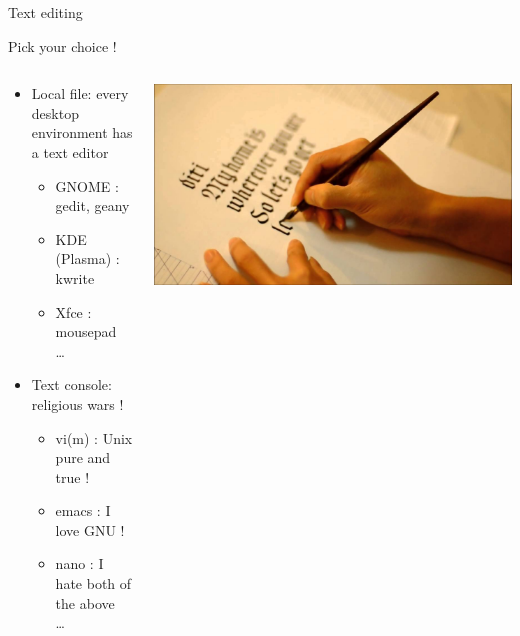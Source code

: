 \documentclass[unknownkeysallowed, 10pt, a4 paper, handout]{beamer}
\begin{document}
\begin{frame}[label=textedit]{Text editing}
  \begin{center}
  Pick your choice !
  \end{center}
  \begin{columns}[T]
    \begin{column}{.55\textwidth}
      \begin{itemize}
        \item Local file: every desktop environment has a text editor
        \begin{itemize}
          \item GNOME : gedit, geany
          \item KDE (Plasma) : kwrite
          \item Xfce : mousepad \\
            \dots
        \end{itemize}
        \item Text console: religious wars !
        \begin{itemize}
          \item vi(m) : Unix pure and true !
          \item emacs : I love GNU !
          \item nano  : I hate both of the above \\
            \dots
        \end{itemize}
      \end{itemize}
    \end{column}
    \hfill
    \begin{column}{.45\textwidth}
      \vspace{10pt}
      \includegraphics[scale=0.1]{pics/manuscript.jpg}
    \end{column}
  \end{columns}
\end{frame}
\end{document}
